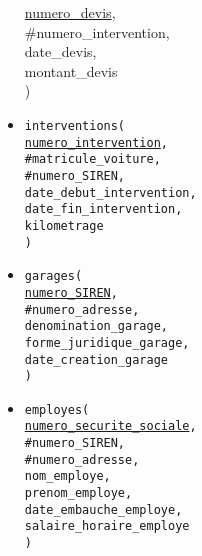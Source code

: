 \documentclass[a4paper,11pt]{article} %
\begin{document}
\begin{itemize}[leftmargin=*]
{        \underline{numero\_devis}, \\
        \#numero\_intervention, \\
        date\_devis, \\
        montant\_devis \\
    )}
    \item \texttt{interventions( \\
        \underline{numero\_intervention}, \\
        \#matricule\_voiture, \\
        \#numero\_SIREN, \\
        date\_debut\_intervention, \\
        date\_fin\_intervention, \\
        kilometrage \\
    )}
    \item \texttt{garages( \\
        \underline{numero\_SIREN}, \\
        \#numero\_adresse, \\
        denomination\_garage, \\
        forme\_juridique\_garage, \\
        date\_creation\_garage \\
    )}
    \item \texttt{employes( \\
        \underline{numero\_securite\_sociale}, \\
        \#numero\_SIREN, \\
        \#numero\_adresse, \\
        nom\_employe, \\
        prenom\_employe, \\
        date\_embauche\_employe, \\
        salaire\_horaire\_employe \\
    )}
\end{itemize}
\end{document}
